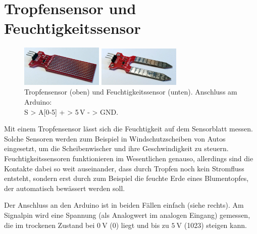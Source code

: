 \newpage
\section{Tropfensensor und Feuchtigkeitssensor}
\label{sec:tropfensensor}

\begin{figure}
	\centering
	\includegraphics[width=0.35\textwidth]{./pics/tropfensensor.jpg}
	
	\includegraphics[width=0.35\textwidth]{./pics/feuchtigkeitssensor.jpg}
	\caption{Tropfensensor (oben) und Feuchtigkeitssensor (unten). Anschluss am Arduino: \\S > A[0-5] \qquad + > 5\,V \qquad - > GND.}
\end{figure}
Mit einem Tropfensensor lässt sich die Feuchtigkeit auf dem Sensorblatt messen. Solche Sensoren werden zum Beispiel in Windschutzscheiben von Autos eingesetzt, um die Scheibenwischer und ihre Geschwindigkeit zu steuern. Feuchtigkeitssensoren funktionieren im Wesentlichen genauso, allerdings sind die Kontakte dabei so weit auseinander, dass durch Tropfen noch kein Stromfluss entsteht, sondern erst durch zum Beispiel die feuchte Erde eines Blumentopfes, der automatisch bewässert werden soll.

Der Anschluss an den Arduino ist in beiden Fällen einfach (siehe rechts). Am Signalpin wird eine Spannung (als Analogwert im analogen Eingang) gemessen, die im trockenen Zustand bei $\SI{0}{\volt}$ (0) liegt und bis zu $\SI{5}{\volt}$ (1023) steigen kann.

